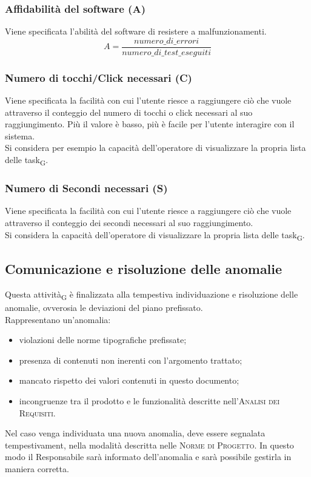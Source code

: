 \subsubsection{Affidabilità del software (A)}
Viene specificata l'abilità del software di resistere a malfunzionamenti.
\[A = \frac{numero\_di\_errori}{numero\_di\_test\_eseguiti}\]

\subsubsection{Numero di tocchi/Click necessari (C)}
Viene specificata la facilità con cui l'utente riesce a raggiungere ciò che vuole attraverso il conteggio del numero di tocchi o click necessari al suo raggiungimento. Più il valore è basso, più è facile per l'utente interagire con il sistema.\\
Si considera per esempio la capacità dell'operatore di visualizzare la propria lista delle task\textsubscript{G}.

\subsubsection{Numero di Secondi necessari (S)}
Viene specificata la facilità con cui l'utente riesce a raggiungere ciò che vuole attraverso il conteggio dei secondi necessari al suo raggiungimento.\\
Si considera la capacità dell'operatore di visualizzare la propria lista delle task\textsubscript{G}.


\subsection{Comunicazione e risoluzione delle anomalie}

Questa attività\textsubscript{G} è finalizzata alla tempestiva individuazione e risoluzione delle anomalie, ovverosia le deviazioni del piano prefissato.\\ Rappresentano un'anomalia:
\begin{itemize}
    \item violazioni delle norme tipografiche prefissate;
    \item presenza di contenuti non inerenti con l'argomento trattato;
    \item mancato rispetto dei valori contenuti in questo documento;
    \item incongruenze tra il prodotto e le funzionalità descritte nell'\textsc{Analisi dei Requisiti}.
\end{itemize}
Nel caso venga individuata una nuova anomalia, deve essere segnalata tempestivament, nella modalità descritta nelle \textsc{Norme di Progetto}. In questo modo il Responsabile sarà informato dell'anomalia e sarà possibile gestirla in maniera corretta.
